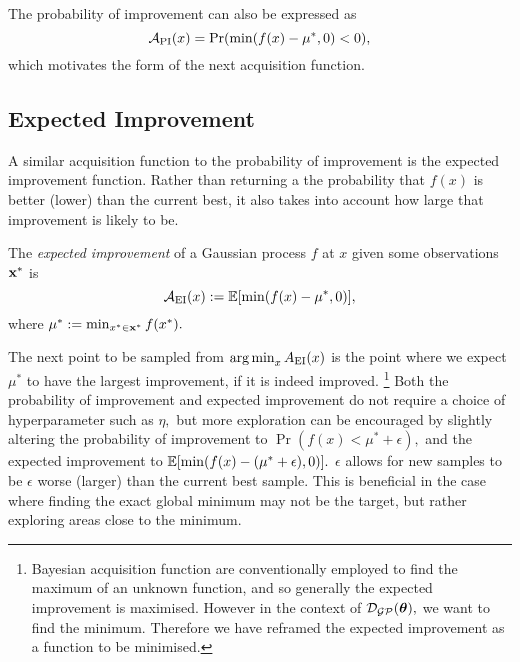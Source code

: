 The probability of improvement can also be expressed as
$$
    \mathcal{A}_\mathrm{PI}(x) = \Pr(\min(f(x) - \mu^\ast, 0) < 0),
$$
which motivates the form of the next acquisition function.

\subsection*{Expected Improvement}

A similar acquisition function to the probability of improvement is the expected
improvement function. Rather than returning a the probability that $f(x)$ is
better (lower) than the current best, it also takes into account how large that
improvement is likely to be.

\begin{definition}
    The \emph{expected improvement} of a Gaussian process $f$ at $x$ given
    some observations $\mathbf{x}^\ast$ is
    $$
        \mathcal{A}_{\mathrm{EI}}(x)
        := \operatorname{\mathbb{E}}[\min(f(x) - \mu^\ast, 0)],
    $$ where $\mu^\ast := \min_{x^\ast\in\mathbf{x}^\ast}f(x^\ast).$
\end{definition}
The next point to be sampled from $\operatorname*{arg\,min}_{x} A_{\mathrm{EI}}(x)$ is the point
where we expect $\mu^\ast$ to have the largest improvement, if it is indeed
improved.
\footnote{
    Bayesian acquisition function are
    conventionally employed to find the maximum of an unknown function,
    and so generally the expected improvement is maximised.
    However in the context of $\mathcal{D}_{\mathcal{GP}}(\bm{\theta}),$ we want to find the minimum.
    Therefore we have reframed the expected improvement 
    as a function to be minimised.
}
Both the probability of improvement and
expected improvement do not require a
choice of hyperparameter such as $\eta,$ but more exploration can be
encouraged by slightly altering the probability of improvement to
$\Pr(f(x) < \mu^\ast + \epsilon),$ and the expected improvement to
$\operatorname{\mathbb{E}}[\min(f(x) - (\mu^\ast + \epsilon), 0)].$ $\epsilon$ allows for
new samples to be $\epsilon$ worse (larger) than the current best sample.
This is beneficial in the case where finding the exact global minimum may not
be the target, but rather exploring areas close to the minimum.



